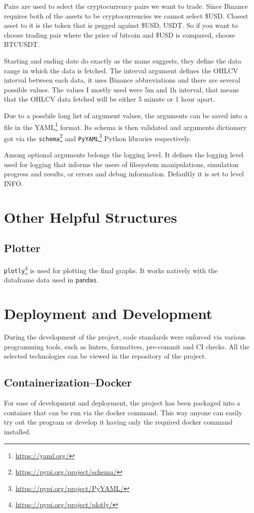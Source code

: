 Pairs are used to select the cryptocurrency pairs we want to trade. Since Binance requires both of the assets to be cryptocurrencies we cannot select \$USD. Closest asset to it is the token that is pegged against \$USD, USDT. So if you want to choose trading pair where the price of bitcoin and \$USD is compared, choose BTCUSDT.

Starting and ending date do exactly as the name suggests, they define the data range in which the data is fetched. The interval argument defines the OHLCV interval between each data, it uses Binance abbreviations and there are several possible values. The values I mostly used were 5m and 1h interval, that means that the OHLCV data fetched will be either 5 minute or 1 hour apart.

Due to a possbile long list of argument values, the arguments can be saved into a file in the YAML\footnote{\url{https://yaml.org/}} format. Its schema is then validated and arguments dictionary got via the \texttt{schema}\footnote{\url{https://pypi.org/project/schema/}} and \texttt{PyYAML}\footnote{\url{https://pypi.org/project/PyYAML/}} Python libraries respectively.

Among optional arguments belongs the logging level. It defines the logging level used for logging that informs the users of filesystem manipulations, simulation progress and results, or errors and debug information. Defaultly it is set to level INFO.

\section{Other Helpful Structures}

\subsection*{Plotter}
\texttt{plotly}\footnote{\url{https://pypi.org/project/plotly/}} is used for plotting the final graphs. It works natively with the dataframe data used in \texttt{pandas}.

\section{Deployment and Development}
During the development of the project, code standards were enforced via various programming tools, such as linters, formatters, pre-commit and CI checks. All the selected technologies can be viewed in the repository of the project.

\subsection*{Containerization--Docker}
For ease of development and deployment, the project has been packaged into a container that can be run via the docker command. This way anyone can easily try out the program or develop it having only the required docker command installed.

